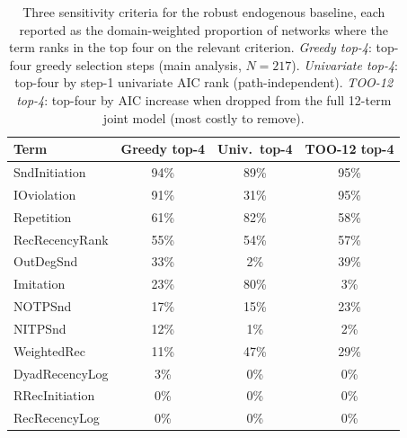 \begin{table}[H]
\centering
\small
\caption{Three sensitivity criteria for the robust endogenous baseline, each
reported as the domain-weighted proportion of networks where the term ranks
in the top four on the relevant criterion. \textit{Greedy top-4}: top-four
greedy selection steps (main analysis, $N=217$). \textit{Univariate top-4}:
top-four by step-1 univariate AIC rank (path-independent). \textit{TOO-12
top-4}: top-four by AIC increase when dropped from the full 12-term joint
model (most costly to remove).}
\label{tab:aic_sensitivity}
\begin{tabular}{lccc}
\toprule
\textbf{Term} & \textbf{Greedy top-4} & \textbf{Univ.\ top-4} & \textbf{TOO-12 top-4} \\
\midrule
  SndInitiation  & 94\% & 89\% & 95\% \\
  IOviolation    & 91\% & 31\% & 95\% \\
  Repetition     & 61\% & 82\% & 58\% \\
  RecRecencyRank & 55\% & 54\% & 57\% \\
\midrule
  OutDegSnd      & 33\% &  2\% & 39\% \\
  Imitation      & 23\% & 80\% &  3\% \\
  NOTPSnd        & 17\% & 15\% & 23\% \\
  NITPSnd        & 12\% &  1\% &  2\% \\
  WeightedRec    & 11\% & 47\% & 29\% \\
  DyadRecencyLog &  3\% &  0\% &  0\% \\
  RRecInitiation &  0\% &  0\% &  0\% \\
  RecRecencyLog  &  0\% &  0\% &  0\% \\
\bottomrule
\end{tabular}
\end{table}
